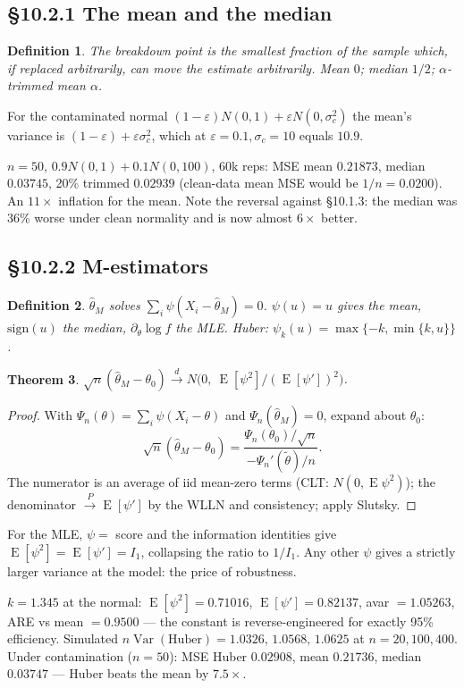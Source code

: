\documentclass[11pt]{article}
\newtheorem{theorem}{Theorem}[section]
\newtheorem{definition}[theorem]{Definition}
\DeclareMathOperator{\Var}{Var}\DeclareMathOperator{\E}{E}
\newcommand{\convP}{\xrightarrow{P}}\newcommand{\convD}{\xrightarrow{d}}
\begin{document}
\subsection{\S10.2.1 The mean and the median}
\begin{definition}
The breakdown point is the smallest fraction of the sample which, if replaced arbitrarily, can move the estimate arbitrarily. Mean $0$; median $1/2$; $\alpha$-trimmed mean $\alpha$.
\end{definition}
For the contaminated normal $(1-\varepsilon)N(0,1)+\varepsilon N(0,\sigma_c^2)$ the mean's variance is $(1-\varepsilon)+\varepsilon\sigma_c^2$, which at $\varepsilon=0.1,\sigma_c=10$ equals $10.9$.
\begin{simbox}
$n=50$, $0.9N(0,1)+0.1N(0,100)$, 60k reps: MSE mean $0.21873$, median $0.03745$, 20\% trimmed $0.02939$ (clean-data mean MSE would be $1/n=0.0200$). An $11\times$ inflation for the mean. Note the reversal against \S10.1.3: the median was 36\% worse under clean normality and is now almost $6\times$ better.
\end{simbox}

\subsection{\S10.2.2 M-estimators}
\begin{definition}
$\hat\theta_M$ solves $\sum_i\psi(X_i-\hat\theta_M)=0$. $\psi(u)=u$ gives the mean, $\mathrm{sign}(u)$ the median, $\partial_\theta\log f$ the MLE. Huber: $\psi_k(u)=\max\{-k,\min\{k,u\}\}$.
\end{definition}
\begin{theorem}
$\sqrt n(\hat\theta_M-\theta_0)\convD N\big(0,\ \E[\psi^2]/(\E[\psi'])^2\big)$.
\end{theorem}
\begin{proof}
With $\Psi_n(\theta)=\sum_i\psi(X_i-\theta)$ and $\Psi_n(\hat\theta_M)=0$, expand about $\theta_0$:
\[\sqrt n(\hat\theta_M-\theta_0)=\frac{\Psi_n(\theta_0)/\sqrt n}{-\Psi_n'(\tilde\theta)/n}.\]
The numerator is an average of iid mean-zero terms (CLT: $N(0,\E\psi^2)$); the denominator $\convP\E[\psi']$ by the WLLN and consistency; apply Slutsky.
\end{proof}
For the MLE, $\psi=$ score and the information identities give $\E[\psi^2]=\E[\psi']=I_1$, collapsing the ratio to $1/I_1$. Any other $\psi$ gives a strictly larger variance at the model: the price of robustness.
\begin{simbox}
$k=1.345$ at the normal: $\E[\psi^2]=0.71016$, $\E[\psi']=0.82137$, avar $=1.05263$, ARE vs mean $=0.9500$ --- the constant is reverse-engineered for exactly 95\% efficiency. Simulated $n\Var(\text{Huber})=1.0326,\,1.0568,\,1.0625$ at $n=20,100,400$. Under contamination ($n=50$): MSE Huber $0.02908$, mean $0.21736$, median $0.03747$ --- Huber beats the mean by $7.5\times$.
\end{simbox}
\end{document}
